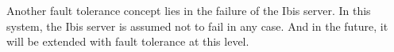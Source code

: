 Another fault tolerance concept lies in the failure of the Ibis server. In this system, the Ibis server is assumed not to fail in any case. And in the future, it will be extended with fault tolerance at this level.









